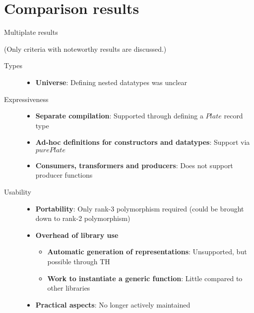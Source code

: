 \documentclass[10pt]{beamer}
\begin{document}
\section{Comparison results}

\begin{frame}{Multiplate results}

(Only criteria with noteworthy results are discussed.)
\begin{description}
\item[Types]
\begin{itemize}
\item \textbf{Universe}: Defining nested datatypes was unclear
\end{itemize}
\end{description}

\begin{description}
\item[Expressiveness]
\begin{itemize}
\item \textbf{Separate compilation}: Supported through defining a $ Plate $ record type
\item \textbf{Ad-hoc definitions for constructors and datatypes}: Support via $ purePlate $ 
\item \textbf{Consumers, transformers and producers}: Does not support producer functions
\end{itemize}
\end{description}

\begin{description}
\item[Usability]
\begin{itemize}
\item \textbf{Portability}: Only rank-3 polymorphism required (could be brought down to rank-2 polymorphism)
\item \textbf{Overhead of library use}
\begin{itemize}
\item \textbf{Automatic generation of representations}: Unsupported, but possible through TH
\item \textbf{Work to instantiate a generic function}: Little compared to other libraries
\end{itemize}
\item \textbf{Practical aspects}: No longer actively maintained
\end{itemize}
\end{description}

\end{frame}
\end{document}
